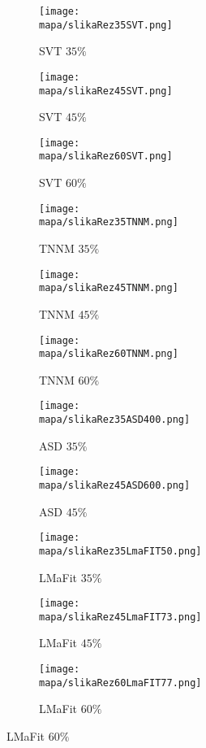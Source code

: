 \begin{figure}[!ht]
    \centering
    \begin{subfigure}{0.325\linewidth}
        \texttt{[image: \\mapa/slikaRez35SVT.png]}
        \caption{SVT $35\%$}
    \end{subfigure}
    \hfill
    \begin{subfigure}{0.325\linewidth}
        \texttt{[image: \\mapa/slikaRez45SVT.png]}
        \caption{SVT $45\%$}
    \end{subfigure}
    \hfill
    \begin{subfigure}{0.325\linewidth}
        \texttt{[image: \\mapa/slikaRez60SVT.png]}
        \caption{SVT $60\%$}
    \end{subfigure}
    \begin{subfigure}{0.325\linewidth}
        \texttt{[image: \\mapa/slikaRez35TNNM.png]}
        \caption{TNNM $35\%$}
    \end{subfigure}
    \hfill
    \begin{subfigure}{0.325\linewidth}
        \texttt{[image: \\mapa/slikaRez45TNNM.png]}
        \caption{TNNM $45\%$}
    \end{subfigure}
    \hfill
    \begin{subfigure}{0.325\linewidth}
        \texttt{[image: \\mapa/slikaRez60TNNM.png]}
        \caption{TNNM $60\%$}
    \end{subfigure}
    \begin{subfigure}{0.325\linewidth}
        \texttt{[image: \\mapa/slikaRez35ASD400.png]}
        \caption{ASD $35\%$}
    \end{subfigure}
    \hfill
    \begin{subfigure}{0.325\linewidth}
        \texttt{[image: \\mapa/slikaRez45ASD600.png]}
        \caption{ASD $45\%$}
    \end{subfigure}
    \begin{subfigure}{0.325\linewidth}
        \hfill
    \end{subfigure}
    \begin{subfigure}{0.325\linewidth}
        \texttt{[image: \\mapa/slikaRez35LmaFIT50.png]}
        \caption{LMaFit $35\%$}
    \end{subfigure}
    \hfill
    \begin{subfigure}{0.325\linewidth}
        \texttt{[image: \\mapa/slikaRez45LmaFIT73.png]}
        \caption{LMaFit $45\%$}
    \end{subfigure}
    \begin{subfigure}{0.325\linewidth}
        \texttt{[image: \\mapa/slikaRez60LmaFIT77.png]}
        \caption{LMaFit $60\%$}
    \end{subfigure}
\end{figure}
